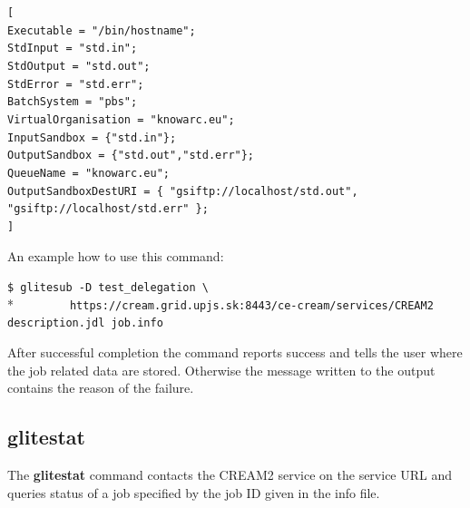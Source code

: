 \documentclass{article}
\begin{document}
\begin{minipage}{\textwidth}
\begin{framed}
\verb#[#\\
\verb#Executable = "/bin/hostname";#\\
\verb#StdInput = "std.in";#\\
\verb#StdOutput = "std.out";#\\
\verb#StdError = "std.err";#\\
\verb#BatchSystem = "pbs";#\\
\verb#VirtualOrganisation = "knowarc.eu";#\\
\verb#InputSandbox = {"std.in"};#\\
\verb#OutputSandbox = {"std.out","std.err"};#\\
\verb#QueueName = "knowarc.eu";#\\
\verb#OutputSandboxDestURI = { "gsiftp://localhost/std.out", "gsiftp://localhost/std.err" };#\\
\verb#]#
\end{framed}
\end{minipage}

An example how to use this command:
\begin{shaded}\verb#$ glitesub -D test_delegation \#\\*
\verb#        https://cream.grid.upjs.sk:8443/ce-cream/services/CREAM2 description.jdl job.info#\end{shaded}%
After successful completion the command reports success and tells the user where the job related data are stored. Otherwise the message written to the output contains the reason of the failure.

\subsection{glitestat}
\label{glitestat}
The \textbf{glitestat} command contacts the CREAM2 service on the service URL and queries status of a job specified by the job ID given in the info file.
\end{document}
